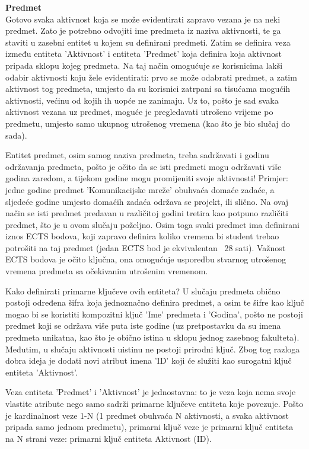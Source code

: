 \documentclass[times, utf8, zavrsni]{fer}
\begin{document}
\textbf{Predmet}\\
Gotovo svaka aktivnost koja se može evidentirati zapravo vezana je na neki predmet. Zato je potrebno odvojiti ime predmeta iz naziva aktivnosti, te ga staviti u zasebni entitet u kojem su definirani predmeti. Zatim se definira veza između entiteta 'Aktivnost' i entiteta 'Predmet' koja definira koja aktivnost pripada sklopu kojeg predmeta. Na taj način omogućuje se korisnicima lakši odabir aktivnosti koju žele evidentirati: prvo se može odabrati predmet, a zatim aktivnost tog predmeta, umjesto da su korisnici zatrpani sa tisućama mogućih aktivnosti, većinu od kojih ih uopće ne zanimaju. Uz to, pošto je sad svaka aktivnost vezana uz predmet, moguće je pregledavati utrošeno vrijeme po predmetu, umjesto samo ukupnog utrošenog vremena (kao što je bio slučaj do sada).

Entitet predmet, osim samog naziva predmeta, treba sadržavati i godinu održavanja predmeta, pošto je očito da se isti predmeti mogu održavati više godina zaredom, a tijekom godine mogu promijeniti svoje aktivnosti! Primjer: jedne godine predmet 'Komunikacijske mreže' obuhvaća domaće zadaće, a sljedeće godine umjesto domaćih zadaća održava se projekt, ili slično. Na ovaj način se isti predmet predavan u različitoj godini tretira kao potpuno različiti predmet, što je u ovom slučaju poželjno. Osim toga svaki predmet ima definirani iznos ECTS bodova, koji zapravo definira koliko vremena bi student trebao potrošiti na taj predmet (jedan ECTS bod je ekvivalentan ~28 sati). Važnost ECTS bodova je očito ključna, ona omogućuje usporedbu stvarnog utrošenog vremena predmeta sa očekivanim utrošenim vremenom.

Kako definirati primarne ključeve ovih entiteta? U slučaju predmeta obično postoji određena šifra koja jednoznačno definira predmet, a osim te šifre kao ključ mogao bi se koristiti kompozitni ključ 'Ime' predmeta i 'Godina', pošto ne postoji predmet koji se održava više puta iste godine (uz pretpostavku da su imena predmeta unikatna, kao što je obično istina u sklopu jednog zasebnog fakulteta). Međutim, u slučaju aktivnosti uistinu ne postoji prirodni ključ. Zbog tog razloga dobra ideja je dodati novi atribut imena 'ID' koji će služiti kao surogatni ključ entiteta 'Aktivnost'.

Veza entiteta 'Predmet' i 'Aktivnost' je jednostavna: to je veza koja nema svoje vlastite atribute nego samo sadrži primarne ključeve entiteta koje povezuje. Pošto je kardinalnost veze 1-N (1 predmet obuhvaća N aktivnosti, a svaka aktivnost pripada samo jednom predmetu), primarni ključ veze je primarni ključ entiteta na N strani veze: primarni ključ entiteta Aktivnost (ID).
\end{document}
